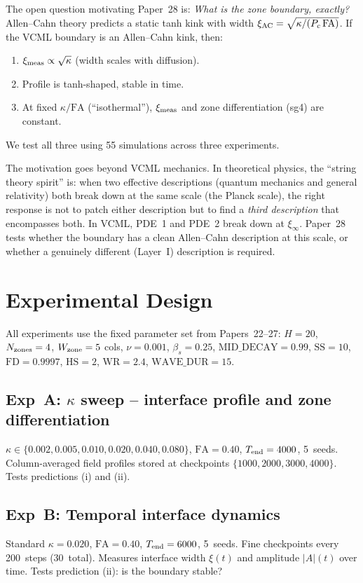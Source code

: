 \documentclass[11pt,a4paper]{article}
\begin{document}
The open question motivating Paper~28 is:
\emph{What is the zone boundary, exactly?}
Allen--Cahn theory predicts a static tanh kink with width
$\xi_{\rm AC} = \sqrt{\kappa/(P_c\,\mathrm{FA})}$.
If the VCML boundary is an Allen--Cahn kink, then:
\begin{enumerate}
  \item $\xi_{\rm meas} \propto \sqrt{\kappa}$ (width scales with diffusion).
  \item Profile is tanh-shaped, stable in time.
  \item At fixed $\kappa/\mathrm{FA}$ (``isothermal''), $\xi_{\rm meas}$ and
        zone differentiation (sg4) are constant.
\end{enumerate}
We test all three using 55 simulations across three experiments.

The motivation goes beyond VCML mechanics.  In theoretical physics, the
``string theory spirit'' is: when two effective descriptions (quantum
mechanics and general relativity) both break down at the same scale (the
Planck scale), the right response is not to patch either description but to
find a \emph{third description} that encompasses both.
In VCML, PDE~1 and PDE~2 break down at $\xi_\infty$.
Paper~28 tests whether the boundary has a clean Allen--Cahn description
at this scale, or whether a genuinely different (Layer~I) description
is required.

\section{Experimental Design}

All experiments use the fixed parameter set from Papers~22--27:
$H=20$, $N_{\rm zones}=4$, $W_{\rm zone}=5$ cols, $\nu=0.001$, $\beta_s=0.25$,
$\mathrm{MID\_DECAY}=0.99$, $\mathrm{SS}=10$, $\mathrm{FD}=0.9997$,
$\mathrm{HS}=2$, $\mathrm{WR}=2.4$, $\mathrm{WAVE\_DUR}=15$.

\subsection*{Exp~A: $\kappa$ sweep -- interface profile and zone differentiation}
$\kappa\in\{0.002,0.005,0.010,0.020,0.040,0.080\}$,
$\mathrm{FA}=0.40$, $T_{\rm end}=4000$, 5~seeds.
Column-averaged field profiles stored at checkpoints $\{1000,2000,3000,4000\}$.
Tests predictions (i) and (ii).

\subsection*{Exp~B: Temporal interface dynamics}
Standard $\kappa=0.020$, $\mathrm{FA}=0.40$, $T_{\rm end}=6000$, 5~seeds.
Fine checkpoints every 200~steps (30~total).
Measures interface width $\xi(t)$ and amplitude $|A|(t)$ over time.
Tests prediction (ii): is the boundary stable?
\end{document}
